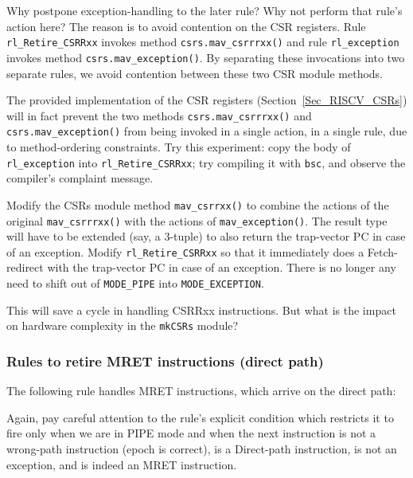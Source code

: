 Why postpone exception-handling to the later rule?  Why not perform
that rule's action here?  The reason is to avoid contention on the CSR
registers.  Rule \verb|rl_Retire_CSRRxx| invokes method
\verb|csrs.mav_csrrrxx()| and rule \verb|rl_exception| invokes method
\verb|csrs.mav_exception()|.  By separating these invocations into two
separate rules, we avoid contention between these two CSR module
methods.


\Exercise

The provided implementation of the CSR registers
(Section~\ref{Sec_RISCV_CSRs}) will in fact prevent the two methods
\verb|csrs.mav_csrrrxx()| and \verb|csrs.mav_exception()| from being
invoked in a single action, {\ie} in a single rule, due to
method-ordering constraints.  Try this experiment: copy the body of
\verb|rl_exception| into \verb|rl_Retire_CSRRxx|; try compiling it
with \verb|bsc|, and observe the compiler's complaint message.

\Exercise

Modify the CSRs module method \verb|mav_csrrxx()| to combine the
actions of the original \verb|mav_csrrrxx()| with the actions of
\verb|mav_exception()|.  The result type will have to be extended
(say, a 3-tuple) to also return the trap-vector PC in case of an
exception.  Modify \verb|rl_Retire_CSRRxx| so that it immediately does
a Fetch-redirect with the trap-vector PC in case of an exception.
There is no longer any need to shift out of \verb|MODE_PIPE| into
\verb|MODE_EXCEPTION|.

\vspace{1ex}

This will save a cycle in handling CSRRxx instructions.  But what is
the impact on hardware complexity in the \verb|mkCSRs| module?

\Endexercise


\subsubsection{Rules to retire MRET instructions (direct path)}

The following rule handles MRET instructions, which arrive on the direct path:



Again, pay careful attention to the rule's explicit condition which
restricts it to fire only when we are in PIPE mode and when the next
instruction is not a wrong-path instruction (epoch is correct), is a
Direct-path instruction, is not an exception, and is indeed an MRET
instruction.


